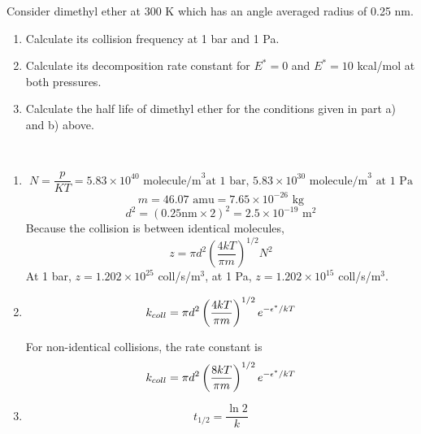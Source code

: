 \item Consider dimethyl ether at 300 K which has an angle averaged radius of 0.25 nm.
\begin{enumerate}
    \item Calculate its collision frequency at 1 bar and 1 Pa.
    \item Calculate its decomposition rate constant for $E^*=0$ and $E^*=10$ kcal/mol at both pressures.
    \item Calculate the half life of dimethyl ether for the conditions given in part a) and b) above.
\end{enumerate}

\begin{solution}\
    \begin{enumerate}
        \item \begin{equation*}
                  N=\frac{p}{KT}=5.83\times10^{40}\text{ molecule/m}^3\text{at 1 bar, }5.83\times10^{30}
                  \text{ molecule/m}^3\text{ at 1 Pa}
              \end{equation*}
              \begin{equation*}
                  m=46.07\text{ amu}=7.65\times10^{-26}\text{ kg}
              \end{equation*}
              \begin{equation*}
                  d^2=(0.25\text{nm}\times2)^2=2.5\times10^{-19}\text{ m}^2
              \end{equation*}
              Because the collision is between identical molecules,
              \begin{equation*}
                  z=\pi d^2\left(\frac{4kT}{\pi m}\right)^{1/2}N^2
              \end{equation*}
              At 1 bar, $z=1.202\times10^{25}$ coll/s/m$^3$, at 1 Pa, $z=1.202\times10^{15}$ coll/s/m$^3$.
        \item \begin{equation*}
                  k_{coll}=\pi d^2\left(\frac{4kT}{\pi m}\right)^{1/2}e^{-\epsilon^*/kT}
              \end{equation*}
              \begin{tcolorbox}
                  For non-identical collisions, the rate constant is
                  \begin{equation*}
                      k_{coll}=\pi d^2\left(\frac{8kT}{\pi m}\right)^{1/2}e^{-\epsilon^*/kT}
                  \end{equation*}
              \end{tcolorbox}
        \item \begin{equation*}
                  t_{1/2}=\frac{\ln2}{k}
              \end{equation*}
    \end{enumerate}
\end{solution}

